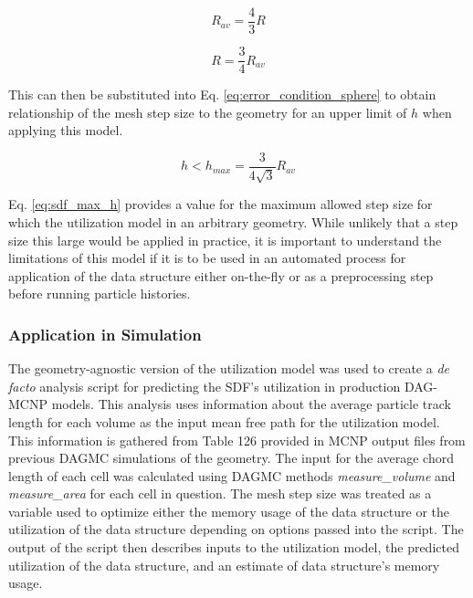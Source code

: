 $$R_{av} = \frac{4}{3}R $$

$$ R = \frac{3}{4} R_{av} $$

This can then be substituted into Eq. \ref{eq:error_condition_sphere}
to obtain relationship of the mesh step size to the geometry for an upper limit
of $h$ when applying this model.

\begin{equation}
 h < h_{max} =  \frac{3}{4\sqrt{3}} R_{av} 
\label{eq:sdf_max_h}
\end{equation}

Eq. \ref{eq:sdf_max_h} provides a value for the maximum allowed step size for
which the utilization model in an arbitrary geometry. While unlikely that a step
size this large would be applied in practice, it is important to understand the
limitations of this model if it is to be used in an automated process for
application of the data structure either on-the-fly or as a preprocessing step
before running particle histories.

\subsubsection{Application in Simulation}

The geometry-agnostic version of the utilization model was used to create a
\textit{de facto} analysis script for predicting the SDF's utilization in
production DAG-MCNP models. This analysis uses information about the average
particle track length for each volume as the input mean free path for the
utilization model. This information is gathered from Table 126 provided in MCNP
output files from previous DAGMC simulations of the geometry. The input for the
average chord length of each cell was calculated using DAGMC methods
\textit{measure\_volume} and \textit{measure\_area} for each cell in
question. The mesh step size was treated as a variable used to optimize either
the memory usage of the data structure or the utilization of the data structure
depending on options passed into the script. The output of the script then
describes inputs to the utilization model, the predicted utilization of the data
structure, and an estimate of data structure's memory usage.
